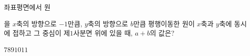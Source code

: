 좌표평면에서 원 \par\smallskip{}\par\smallskip\noindent 을 $x$축의 방향으로 $-1$만큼, $y$축의 방향으로 $b$만큼 평행이동한 원이 $x$축과 $y$축에 동시에 접하고 그 중심이 제$1$사분면 위에 있을 때, $a+b$의 값은? 
\begin{choices32}{$7$}{$8$}{$9$}{$10$}{$11$}\end{choices32}
